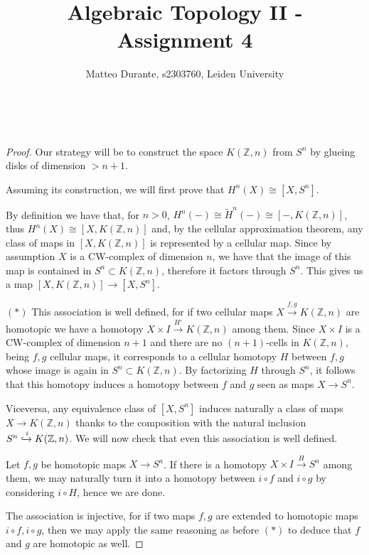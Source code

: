 \documentclass{article}
\newcommand{\numberset}{\mathbb}
\newcommand{\Z}{\numberset{Z}}
\newcommand{\exercise}[1]{\noindent {\bf Exercise #1}}
\begin{document}
\title{Algebraic Topology II - Assignment 4}

\author{Matteo Durante, s2303760, Leiden University}

\maketitle


~\\
\exercise{3}

\begin{proof}
    Our strategy will be to construct the space $K(\Z,n)$ from $S^n$ by glueing
    disks of dimension $>n+1$.
    
    Assuming its construction, we will first prove that $H^n(X)\cong[X,S^n]$.
    
    By definition we have that, for $n>0$,
    $H^n(-)\cong \tilde{H}^n(-)\cong [-,K(\Z,n)]$, thus $H^n(X)\cong[X,K(\Z,n)]$
    and, by the cellular
    approximation theorem, any class of maps in $[X,K(\Z,n)]$ is represented by
    a cellular map. Since by assumption $X$ is a CW-complex of dimension $n$, we
    have that the image of this map is contained in $S^n\subset K(\Z,n)$,
    therefore it factors through $S^n$. This gives us a map
    $[X,K(\Z,n)]\rightarrow[X,S^n]$.
    
    $(*)$ This association is well defined, for if two cellular maps
    $X\xrightarrow{f,g}K(\Z,n)$ are homotopic we have a homotopy $X\times I
    \xrightarrow{H'} K(\Z,n)$ among them. Since $X\times I$ is a CW-complex of
    dimension $n+1$ and there are no
    $(n+1)$-cells in $K(\Z,n)$, being $f,g$ cellular maps, it corresponds to a
    cellular homotopy $H$ between $f,g$ whose image is again in $S^n\subset
    K(\Z,n)$. By factorizing $H$ through $S^n$, it follows that this homotopy
    induces a homotopy between $f$ and $g$ seen as maps $X\rightarrow S^n$.

    Viceversa, any equivalence class of $[X,S^n]$ induces naturally a
    class of maps $X\rightarrow K(\Z,n)$ thanks to the composition with the
    natural inclusion $S^n\xhookrightarrow{i} K(\Z,n)$. We will now check that
    even this association is well defined.
    
    Let $f,g$ be homotopic maps $X\rightarrow S^n$. If there is a homotopy
    $X\times I\xrightarrow{H}S^n$ among them, we
    may naturally turn it into a homotopy between $i\circ f$ and $i\circ g$ by
    considering $i\circ H$, hence we are done.

    The association is injective, for if two maps $f,g$ are extended to
    homotopic maps $i\circ f,i\circ g$, then we may apply the same reasoning as
    before $(*)$ to deduce that $f$ and $g$ are homotopic as well.


\end{proof}
\end{document}
